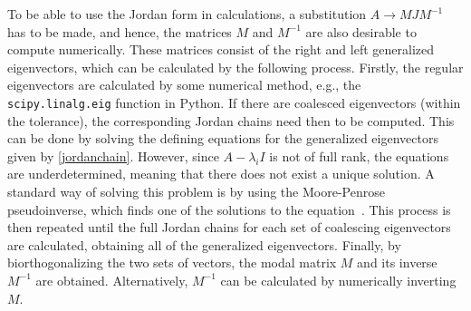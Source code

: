 \documentclass[../main.tex]{subfiles}
\begin{document}
To be able to use the Jordan form in calculations, a substitution $A\rightarrow MJM^{-1}$ has to be made, and hence, the matrices $M$ and $M^{-1}$ are also desirable to compute numerically. These matrices consist of the right and left generalized eigenvectors, which can be calculated by the following process. Firstly, the regular eigenvectors are calculated by some numerical method, e.g., the \verb+scipy.linalg.eig+ function in Python. If there are coalesced eigenvectors (within the tolerance), the corresponding Jordan chains need then to be computed. This can be done by solving the defining equations for the generalized eigenvectors given by \cref{jordanchain}. However, since $A-\lambda_iI$ is not of full rank, the equations are underdetermined, meaning that there does not exist a unique solution. A standard way of solving this problem is by using the Moore-Penrose pseudoinverse, which finds one of the solutions to the equation~\cite{uffe}. This process is then repeated until the full Jordan chains for each set of coalescing eigenvectors are calculated, obtaining all of the generalized eigenvectors. Finally, by biorthogonalizing the two sets of vectors, the modal matrix $M$ and its inverse $M^{-1}$ are obtained. Alternatively, $M^{-1}$ can be calculated by numerically inverting $M$. 


\end{document}
